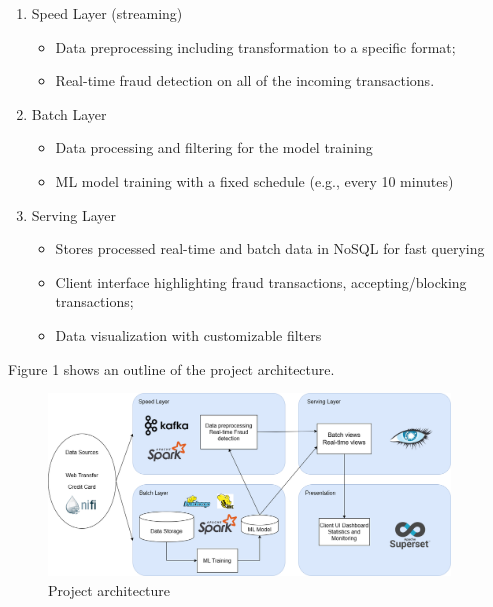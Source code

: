 \documentclass[12pt,a4paper, hidelinks]{article}
\begin{document}
\begin{enumerate}
    \item Speed Layer (streaming)
        \begin{itemize}
            \item Data preprocessing including transformation to a specific format;
            \item Real-time fraud detection on all of the incoming transactions.
        \end{itemize}
    \item Batch Layer
        \begin{itemize}
            \item Data processing and filtering for the model training
            \item ML model training with a fixed schedule (e.g., every 10 minutes)
        \end{itemize}
    \item Serving Layer
        \begin{itemize}
            \item Stores processed real-time and batch data in NoSQL for fast querying
            \item Client interface highlighting fraud transactions, accepting/blocking transactions;
            \item Data visualization with customizable filters
        \end{itemize}
\end{enumerate}

Figure 1 shows an outline of the project architecture.

\begin{figure}[htbp]
    \centering
    \includegraphics[width=0.95\textwidth]{images/m3-architecture.drawio.png}
    \caption{Project architecture}
    \label{fig:architecture}
\end{figure}
\end{document}
